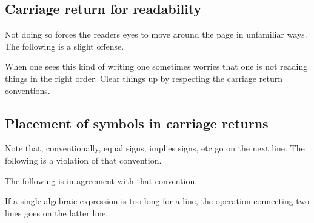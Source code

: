 \documentclass[12pt]{article}
\def\thup{\rightthumbsup}
\def\thdn{\rightthumbsdown}
\begin{document}
\subsection{Carriage return for readability}

Not doing so  forces the readers eyes to move around the page in unfamiliar ways. The following is a slight offense.
\begin{quote}
\thdn
\end{quote}

When one sees this kind of writing one sometimes worries that one is not reading things in the right order. Clear things up by respecting the carriage return conventions.
\begin{quote}
\thup
\end{quote}


\subsection{Placement of symbols in carriage returns}
Note that, conventionally, equal signs, implies signs, etc go on the next line. The following is a violation of that convention.
\begin{center}
 \thdn
\end{center}
The following is in agreement with that convention.
\begin{center}
\thup
\end{center}


If a single algebraic expression is too long for a line, 
the operation connecting two lines goes on the latter line.
\begin{center}
 \thup
\end{center}
\end{document}
